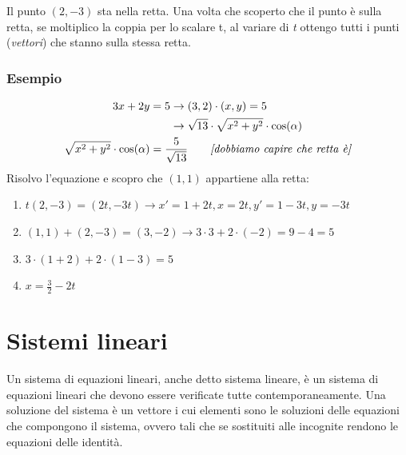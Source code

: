 \documentclass[italian]{article}
\begin{document}
Il punto $(2,-3)$  sta nella retta.
Una volta che scoperto che il punto è sulla retta, se moltiplico la coppia per lo scalare t, al variare di \emph{t} ottengo tutti i punti (\textit{vettori}) che stanno sulla stessa retta.
\subsubsection{Esempio}
\begin{gather*}
	\begin{split}
		3x+2y=5 &\to (3,2)\cdot (x,y) = 5\\
		&\to \sqrt{13}\cdot \sqrt{x^2+y^2}\cdot \cos(\alpha)
	\end{split}\\
	\sqrt{x^2+y^2}\cdot \cos(\alpha) = \frac{5}{\sqrt{13}} \qquad \emph{[dobbiamo capire che retta è]}\\
\end{gather*}
Risolvo l'equazione e scopro che $(1,1)$ appartiene alla retta:

\begin{enumerate}[label=$\rightarrow$]
	\item $t(2,-3)=(2t,-3t) \rightarrow x'=1+2t, x=2t, y'=1-3t, y=-3t$ 
	\item $(1,1)+(2,-3)=(3,-2) \rightarrow 3\cdot 3 + 2\cdot (-2) = 9 - 4 =  5$ 
	\item $3\cdot (1+2) + 2\cdot (1-3) = 5$ 
	\item $x=\frac{3}{2}-2t$
\end{enumerate}

\pagebreak
\section{Sistemi lineari}
Un sistema di equazioni lineari, anche detto sistema lineare, è un sistema di equazioni lineari che devono essere verificate tutte contemporaneamente. Una soluzione del sistema è un vettore i cui elementi sono le soluzioni delle equazioni che compongono il sistema, ovvero tali che se sostituiti alle incognite rendono le equazioni delle identità.
\end{document}
